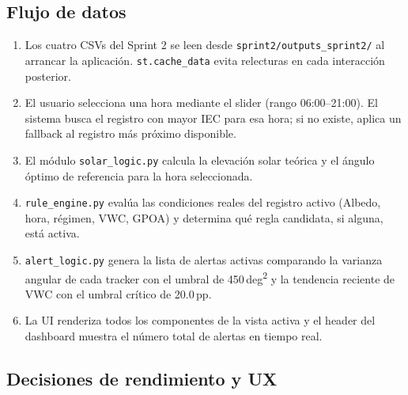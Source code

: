 \documentclass[11pt,a4paper]{article}
\begin{document}
\subsection{Flujo de datos}

\begin{enumerate}
  \item Los cuatro CSVs del Sprint 2 se leen desde \texttt{sprint2/outputs\_sprint2/} al arrancar
    la aplicación. \texttt{st.cache\_data} evita relecturas en cada interacción posterior.
  \item El usuario selecciona una hora mediante el slider (rango 06:00–21:00). El sistema
    busca el registro con mayor IEC para esa hora; si no existe, aplica un fallback al
    registro más próximo disponible.
  \item El módulo \texttt{solar\_logic.py} calcula la elevación solar teórica y el ángulo óptimo
    de referencia para la hora seleccionada.
  \item \texttt{rule\_engine.py} evalúa las condiciones reales del registro activo (Albedo, hora,
    régimen, VWC, GPOA) y determina qué regla candidata, si alguna, está activa.
  \item \texttt{alert\_logic.py} genera la lista de alertas activas comparando la varianza angular
    de cada tracker con el umbral de 450\,deg\textsuperscript{2} y la tendencia reciente de VWC
    con el umbral crítico de 20.0\,pp.
  \item La UI renderiza todos los componentes de la vista activa y el header del dashboard
    muestra el número total de alertas en tiempo real.
\end{enumerate}

\subsection{Decisiones de rendimiento y UX}
\end{document}
